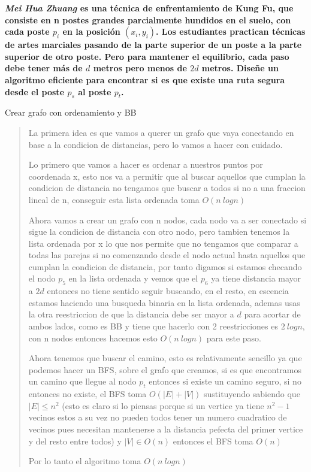 \textbf{
    \textit{Mei Hua Zhuang} es una técnica de enfrentamiento
    de Kung Fu, que consiste en n postes grandes parcialmente
    hundidos en el suelo, con cada poste $p_i$ en la posición
    $(x_i,y_i)$. Los estudiantes practican técnicas de artes 
    marciales pasando de la parte superior de un poste a la 
    parte superior de otro poste. Pero para mantener el equilibrio,
    cada paso debe tener más de $d$ metros pero menos de $2d$ metros.
    Diseñe un algoritmo eficiente para encontrar si es que existe
    una ruta segura desde el poste $p_s$ al poste $p_t$.
}\vspace{.2cm}

\textcolor{bibi}{Crear grafo con ordenamiento y BB}
\begin{quote}
    La primera idea es que vamos a querer un grafo que vaya conectando en base a la condicion de distancias, pero lo vamos a hacer con cuidado. \vspace{.2cm}

    Lo primero que vamos a hacer es ordenar a nuestros puntos por coordenada x, esto nos va a permitir que al buscar aquellos que cumplan la condicion de distancia no tengamos que buscar a todos si no a una fraccion lineal de n, conseguir esta lista ordenada toma $O(n \ log n)$ \vspace{.2cm}

    Ahora vamos a crear un grafo con n nodos, cada nodo va a ser conectado si sigue la condicion de distancia con otro nodo, pero tambien tenemos la lista ordenada por x lo que nos permite que no tengamos que comparar a todas las parejas si no comenzando desde el nodo actual hasta aquellos que cumplan la condicion de distancia, por tanto digamos si estamos checando el nodo $p_5$ en la lista ordenada y vemos que el $p_6$ ya tiene distancia mayor a $2d$ entonces no tiene sentido seguir buscando, en el resto, en escencia estamos haciendo una busqueda binaria en la lista ordenada, ademas usas la otra reestriccion de que la distancia debe ser mayor a $d$ para acortar de ambos lados, como es BB y tiene que hacerlo con 2 reestricciones es $2 \ log n$, con n nodos entonces hacemos esto $O(n \ log n)$ para este paso. \vspace{.2cm}

    Ahora tenemos que buscar el camino, esto es relativamente sencillo ya que podemos hacer un BFS, sobre el grafo que creamos, si es que encontramos un camino que llegue al nodo $p_t$ entonces si existe un camino seguro, si no entonces no existe, el BFS toma $O(|E|+|V|)$ sustituyendo sabiendo que $|E| \leq n^2$ (esto es claro si lo piensas porque si un vertice ya tiene $n^2-1$ vecinos estos a su vez no pueden todos tener un numero cuadratico de vecinos pues necesitan mantenerse a la distancia pefecta del primer vertice y del resto entre todos) y $|V| \in O(n)$ entonces el BFS toma $O(n)$ \vspace{.2cm}

    Por lo tanto el algoritmo toma $O(n \ log n)$ \vspace{.2cm}
\end{quote}